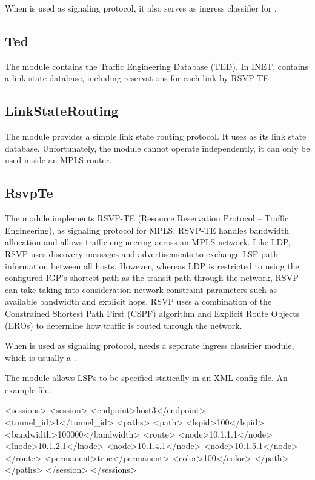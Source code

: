 When  is used as signaling protocol, it also serves as ingress
classifier for .

\subsection{Ted}

The  module contains the Traffic Engineering Database (TED). 
In INET,  contains a link state database, including reservations
for each link by RSVP-TE.

\subsection{LinkStateRouting}

The  module provides a simple link state routing
protocol. It uses  as its link state database. Unfortunately, the
 module cannot operate independently, it can only be
used inside an MPLS router.

 \subsection{RsvpTe}

The  module implements RSVP-TE (Resource Reservation Protocol --
Traffic Engineering), as signaling protocol for MPLS. RSVP-TE handles bandwidth
allocation and allows traffic engineering across an MPLS network. Like LDP, RSVP
uses discovery messages and advertisements to exchange LSP path information
between all hosts. However, whereas LDP is restricted to using the configured
IGP's shortest path as the transit path through the network, RSVP can take
taking into consideration network constraint parameters such as available
bandwidth and explicit hops. RSVP uses a combination of the Constrained Shortest
Path First (CSPF) algorithm and Explicit Route Objects (EROs) to determine how
traffic is routed through the network.

When  is used as signaling protocol,  needs a
separate ingress classifier module, which is usually a .

The  module allows LSPs to be specified statically in an XML
config file. An example  file:

\begin{XML}
<sessions>
    <session>
        <endpoint>host3</endpoint>
        <tunnel_id>1</tunnel_id>
        <paths>
            <path>
                <lspid>100</lspid>
                <bandwidth>100000</bandwidth>
                <route>
                    <node>10.1.1.1</node>
                    <lnode>10.1.2.1</lnode>
                    <node>10.1.4.1</node>
                    <node>10.1.5.1</node>
                </route>
                <permanent>true</permanent>
                <color>100</color>
            </path>
        </paths>
    </session>
</sessions>
\end{XML}

